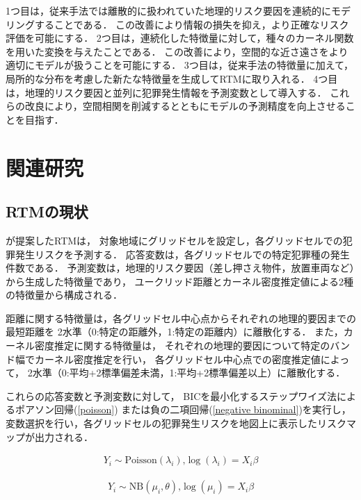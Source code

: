 \documentclass[12pt,a4paper,oneside]{jsbook}
\theoremstyle{plain}
\begin{document}
1つ目は，従来手法では離散的に扱われていた地理的リスク要因を連続的にモデリングすることである．
この改善により情報の損失を抑え，より正確なリスク評価を可能にする． 
2つ目は，連続化した特徴量に対して，種々のカーネル関数を用いた変換を与えたことである．
この改善により，空間的な近さ遠さをより適切にモデルが扱うことを可能にする．
3つ目は，従来手法の特徴量に加えて，局所的な分布を考慮した新たな特徴量を生成してRTMに取り入れる．
4つ目は，地理的リスク要因と並列に犯罪発生情報を予測変数として導入する．
これらの改良により，空間相関を削減するとともにモデルの予測精度を向上させることを目指す．
\chapter{関連研究}
\label{chapter_2}
\section{RTMの現状}
\label{conventional-method}
\citet{caplan2015risk}が提案したRTMは，
対象地域にグリッドセルを設定し，各グリッドセルでの犯罪発生リスクを予測する．
応答変数は，各グリッドセルでの特定犯罪種の発生件数である．
予測変数は，地理的リスク要因（差し押さえ物件，放置車両など）から生成した特徴量であり，
ユークリッド距離とカーネル密度推定値による2種の特徴量から構成される．

距離に関する特徴量は，各グリッドセル中心点からそれぞれの地理的要因までの最短距離を
2水準（0:特定の距離外，1:特定の距離内）に離散化する．
また，カーネル密度推定に関する特徴量は，
それぞれの地理的要因について特定のバンド幅でカーネル密度推定を行い，
各グリッドセル中心点での密度推定値によって，
2水準（0:平均+2標準偏差未満，1:平均+2標準偏差以上）に離散化する．

これらの応答変数と予測変数に対して，
BICを最小化するステップワイズ法\citep{islp}によるポアソン回帰\citep{68aee965-a8a0-3e72-9f89-8d89ae91a62b}(\ref{poisson})
または負の二項回帰\citep{Hilbe_2011}(\ref{negative binominal})を実行し，
変数選択を行い，各グリッドセルの犯罪発生リスクを地図上に表示したリスクマップが出力される．

\begin{align}\label{poisson}
  Y_i \sim \text{Poisson}(\lambda_i) \text{,}
  \log(\lambda_i) = X_i \beta 
\end{align}

\begin{align}\label{negative binominal}
  Y_i \sim \text{NB}(\mu_i, \theta) \text{,}
  \log(\mu_i) = X_i \beta 
\end{align}
\end{document}

